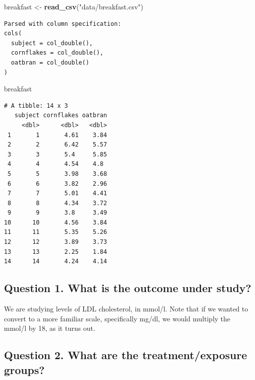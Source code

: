\documentclass[
]{book}
\newenvironment{Shaded}{\begin{snugshade}}{\end{snugshade}}
\newcommand{\KeywordTok}[1]{\textcolor[rgb]{0.13,0.29,0.53}{\textbf{#1}}}
\newcommand{\NormalTok}[1]{#1}
\newcommand{\StringTok}[1]{\textcolor[rgb]{0.31,0.60,0.02}{#1}}
\begin{document}
\begin{Shaded}
\begin{Highlighting}[]
\NormalTok{breakfast <-}\StringTok{ }\KeywordTok{read_csv}\NormalTok{(}\StringTok{"data/breakfast.csv"}\NormalTok{)}
\end{Highlighting}
\end{Shaded}

\begin{verbatim}
Parsed with column specification:
cols(
  subject = col_double(),
  cornflakes = col_double(),
  oatbran = col_double()
)
\end{verbatim}

\begin{Shaded}
\begin{Highlighting}[]
\NormalTok{breakfast}
\end{Highlighting}
\end{Shaded}

\begin{verbatim}
# A tibble: 14 x 3
   subject cornflakes oatbran
     <dbl>      <dbl>   <dbl>
 1       1       4.61    3.84
 2       2       6.42    5.57
 3       3       5.4     5.85
 4       4       4.54    4.8 
 5       5       3.98    3.68
 6       6       3.82    2.96
 7       7       5.01    4.41
 8       8       4.34    3.72
 9       9       3.8     3.49
10      10       4.56    3.84
11      11       5.35    5.26
12      12       3.89    3.73
13      13       2.25    1.84
14      14       4.24    4.14
\end{verbatim}

\hypertarget{question-1.-what-is-the-outcome-under-study-1}{%
\subsection{Question 1. What is the outcome under study?}\label{question-1.-what-is-the-outcome-under-study-1}}

We are studying levels of LDL cholesterol, in mmol/l. Note that if we wanted to convert to a more familiar scale, specifically mg/dl, we would multiply the mmol/l by 18, as it turns out.

\hypertarget{question-2.-what-are-the-treatmentexposure-groups-1}{%
\subsection{Question 2. What are the treatment/exposure groups?}\label{question-2.-what-are-the-treatmentexposure-groups-1}}
\end{document}
